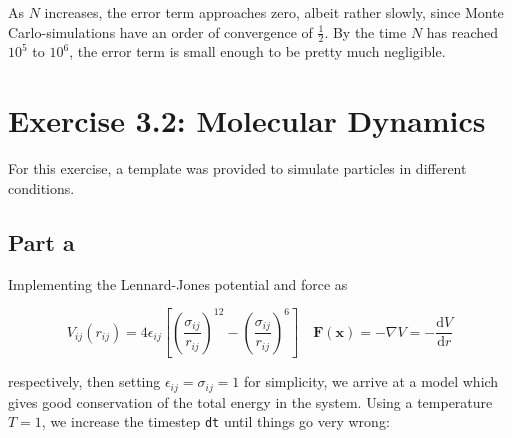 \documentclass[a4paper,12pt]{article}
\begin{document}
As $N$ increases, the error term approaches zero, albeit rather slowly, since Monte Carlo-simulations have an order
of convergence of $\frac{1}{2}$. By the time $N$ has reached $10^5$ to $10^6$, the error term is small enough to be
pretty much negligible. 

\section*{Exercise 3.2: Molecular Dynamics}

For this exercise, a template was provided to simulate particles in different conditions.

\subsection*{Part a}

Implementing the Lennard-Jones potential and force as

$$
  V_{ij}(r_{ij}) = 4\epsilon_{ij}\left[ \left( \frac{\sigma_{ij}}{r_{ij}} \right)^{12} - \left( \frac{\sigma_{ij}}{r_{ij}} \right)^6 \right]
  \quad
  \mathbf{F}(\mathbf{x}) = -\nabla V = -\frac{\mathrm{d}V}{\mathrm{d}r}
$$

respectively, then setting $\epsilon_{ij} = \sigma_{ij} = 1$ for simplicity, we arrive at a model which gives good
conservation of the total energy in the system. Using a temperature $T = 1$, we increase the timestep \texttt{dt}
until things go very wrong:
\end{document}
